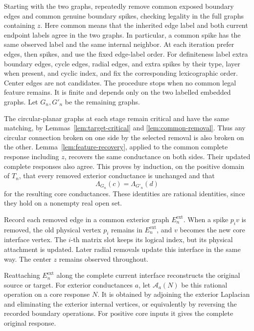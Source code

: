 \documentclass[11pt]{article}
\theoremstyle{definition}
\begin{document}
Starting with the two graphs, repeatedly remove common exposed boundary
edges and common genuine boundary spikes, checking legality in the
full graphs containing \(z\).
Here common means that the inherited edge label and both current
endpoint labels agree in the two graphs. In particular, a common
spike has the same observed label and the same internal neighbor.
At each iteration prefer edges, then spikes, and use the fixed edge-label
order. For definiteness label extra boundary edges, cycle edges,
radial edges, and extra spikes by their type, layer when present, and
cyclic index, and fix the corresponding lexicographic order.
Center edges are not candidates. The procedure stops when no
common legal feature remains. It is finite and depends only on the two
labelled embedded graphs. Let \(G_n,G'_n\) be the remaining graphs.

The circular-planar graphs at each stage remain critical and have
the same matching, by Lemmas~\ref{lem:target-critical} and
\ref{lem:common-removal}. Thus any circular connection broken on one
side by the selected removal is also broken on the other.
Lemma~\ref{lem:feature-recovery}, applied to the common complete
response including \(z\), recovers the same conductance on both sides.
Their updated complete responses also agree. This proves by induction,
on the positive domain of \(T_n\), that every removed exterior
conductance is unchanged and that
\begin{equation}
 \Lambda_{G_n}(c)=\Lambda_{G'_n}(d)
 \label{eq:core-equality}
\end{equation}
for the resulting core conductances. These identities are rational
identities, since they hold on a nonempty real open set.

Record each removed edge in a common exterior graph \(E_n^{\mathrm{ext}}\).
When a spike \(p_i v\) is removed, the old physical vertex \(p_i\)
remains in \(E_n^{\mathrm{ext}}\), and \(v\) becomes the new core interface vertex.
The \(i\)-th matrix slot keeps its logical index, but its physical
attachment is updated. Later radial removals update this interface
in the same way.
The center \(z\) remains observed throughout.

Reattaching \(E_n^{\mathrm{ext}}\) along the complete current interface reconstructs
the original source or target. For exterior conductances \(a\), let
\(\mathcal A_a(N)\) be this rational operation on a core response \(N\).
It is obtained by adjoining the exterior Laplacian and eliminating
the exterior internal vertices, or equivalently by reversing the
recorded boundary operations.
For positive core inputs it gives the complete original response.
\end{document}
